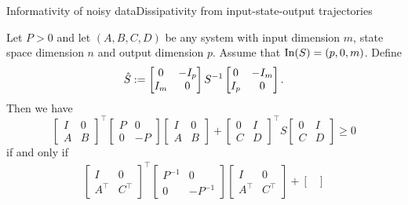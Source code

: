 \documentclass[aspectratio=169, handout, 10pt, hyperref=colorlinks]{beamer}
\begin{document}
\begin{frame}[allowframebreaks]{Informativity of noisy data}{Dissipativity from input-state-output trajectories}
\begin{theorem}
    \end{theorem}
    \begin{lem}\label{ch5:lem:diss dual}
    Let  $P > 0$ and let $(A,B,C,D)$ be any system with input dimension $m$, state space dimension $n$ and output dimension $p$. Assume that $\operatorname{In}(S) = (p,0,m)$. Define
    \begin{equation}
    \label{ch5:eq:Shat}
     \hat{S}:=\begin{bmatrix} 0&-I_p\\
     I_m&0 \end{bmatrix} S^{-1} \begin{bmatrix} 0&-I_m\\I_p&0 \end{bmatrix}.
    \end{equation}
    Then we have
    \begin{equation}
    \label{ch5:eq:eqL1}
    \begin{bmatrix}
    I&0\\
    A&B
    \end{bmatrix}^\top\!\!\begin{bmatrix}
    P&0\\
    0&-P
    \end{bmatrix}\begin{bmatrix}
    I&0\\
    A&B
    \end{bmatrix}+\begin{bmatrix}
    0&I\\
    C&D
    \end{bmatrix}^\top\!\! S \begin{bmatrix}
    0&I\\
    C&D
    \end{bmatrix}\geq 0
    \end{equation}
    if and only if 
    \begin{align}\label{ch5:eq:L2}
    \begin{bmatrix}
    I&0 \!\\
    A^\top&C^\top\!
    \end{bmatrix}^\top\!\!\!\begin{bmatrix}
    P^{-1}&0\\
    0&-P^{-1}
    \end{bmatrix}\!\!\!
    \begin{bmatrix}
    I&0\!\! \\
    A^\top&C^\top\!\!
    \end{bmatrix}\!\!+\!\!\begin{bmatrix}

\end{bmatrix}
\end{align}
\end{lem}
\end{frame}
\end{document}
